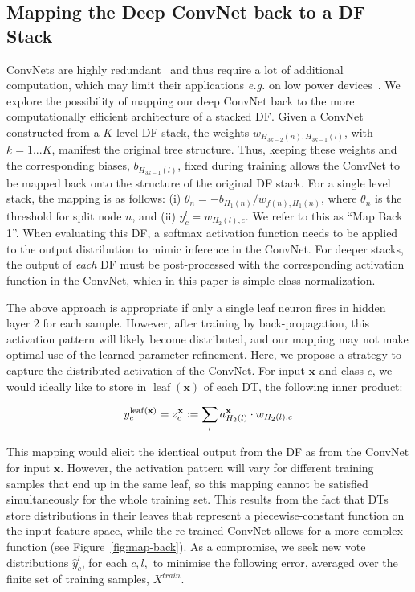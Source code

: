 \documentclass[twocolumn]{svjour3}
\DeclareMathOperator{\leaf}{leaf}
\begin{document}
\subsection{Mapping the Deep ConvNet back to a DF Stack}
\label{subsec:back-map}

ConvNets are highly redundant~\cite{Liu:sparseCNN} and thus require a lot of additional computation, which may limit their applications \textit{e.g.} on low power devices~\cite{GolodetzSVVCAPK15, Massiceti:2016wg}.
We explore the possibility of mapping our deep ConvNet back to the more computationally efficient architecture of a stacked DF.
Given a ConvNet constructed from a $K$-level DF stack, the weights $w_{H_{3k-2}(n),H_{3k-1}(l)}$, with $k=1...K$, manifest the original tree structure.
Thus, keeping these weights and the corresponding biases, $b_{H_{3k-1}(l)}$, fixed during training allows the ConvNet to be mapped back onto the structure of the original DF stack.
For a single level stack, the mapping is as follows: (i) $\theta_n = -b_{H_1(n)}/w_{f(n),H_1(n)}$, where $\theta_n$ is the threshold for split node $n$, and (ii) $y^l_c = w_{H_2(l),c}$.
We refer to this as ``Map Back 1''.
When evaluating this DF, a softmax activation function needs to be applied to the output distribution to mimic inference in the ConvNet.
For deeper stacks, the output of \emph{each} DF must be post-processed with the corresponding activation function in the ConvNet, which in this paper is simple class normalization.

The above approach is appropriate if only a single leaf neuron fires in hidden layer $2$ for each sample. However, after training by back-propagation, this activation pattern will likely become distributed, and our mapping may not make optimal use of the learned parameter refinement.
Here, we propose a strategy to capture the distributed activation of the ConvNet.
For input $\mathbf{x}$ and class $c$, we would ideally like to store in $\leaf(\mathbf{x})$ of each DT, the following inner product:

\begin{equation}
y^{\leaf(\mathbf{x})}_c = z^{\mathbf{x}}_c := \nobreak{\sum_{l} a^\mathbf{x}_{H_2(l)} \cdot w_{H_2(l),c}}
\end{equation}

This mapping would elicit the identical output from the DF as from the ConvNet for input $\mathbf{x}$.
However, the activation pattern will vary for different training samples that end up in the same leaf, so this mapping cannot be satisfied simultaneously for the whole training set.
This results from the fact that DTs store distributions in their leaves that represent a piecewise-constant function on the input feature space, while the re-trained ConvNet allows for a more complex function
(see Figure~\ref{fig:map-back}).
As a compromise, we seek new vote distributions $\hat{y}^l_c$, for each $c,l,$ to minimise the following error, averaged over the finite set of training samples, $X^{train}$.
\end{document}
